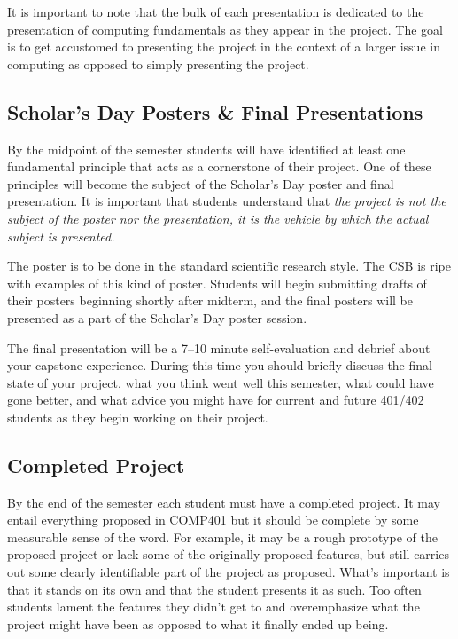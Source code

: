 \documentclass[10pt]{article}
\begin{document}
It is important to note that the bulk of each presentation is dedicated to the presentation of computing fundamentals as they appear in the project. The goal is to get accustomed to presenting the project in the context of a larger issue in computing as opposed to simply presenting the project.

\subsection{Scholar's Day Posters \& Final Presentations}

By the midpoint of the semester students will have identified at least one fundamental principle that acts as a cornerstone of their project. One of these principles will become the subject of the Scholar's Day poster and final presentation. It is important that students understand that \textit{the project is not the subject of the poster nor the presentation, it is the vehicle by which the actual subject is presented.}

The poster is to be done in the standard scientific research style. The CSB is ripe with examples of this kind of poster. Students will begin submitting drafts of their posters beginning shortly after midterm, and the final posters will be presented as a part of the Scholar's Day poster session.

The final presentation will be a 7--10 minute self-evaluation and debrief about your capstone experience. During this time you should briefly discuss the final state of your project, what you think went well this semester, what could have gone better, and what advice you might have for current and future 401/402 students as they begin working on their project.

\subsection{Completed Project}

By the end of the semester each student must have a completed project. It may entail everything proposed in COMP401 but it should be complete by some measurable sense of the word. For example, it may be a rough prototype of the proposed project or lack some of the originally proposed features, but still carries out some clearly identifiable part of the project as proposed. What's important is that it stands on its own and that the student presents it as such. Too often students lament the features they didn't get to and overemphasize what the project might have been as opposed to what it finally ended up being.
\end{document}

